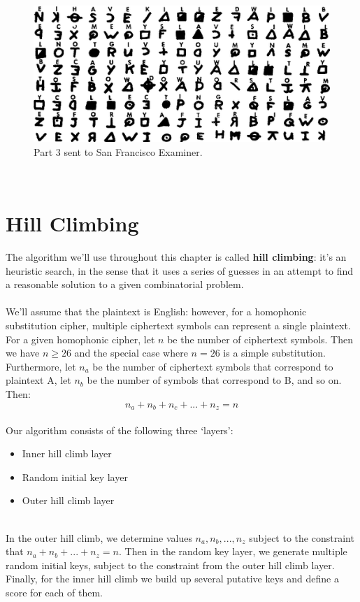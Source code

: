 \documentclass[Lau,binding=0.6cm,oneside]{sapthesis}
\begin{document}
\begin{figure}[H]
\includegraphics[scale=0.7]{zodiac_408_3}
\centering
\caption{Part 3 sent to San Francisco Examiner.}
\centering
\end{figure}
\ \\

\section{Hill Climbing}
The algorithm we'll use throughout this chapter is called \textbf{hill climbing}\supercite{homophonic_cryptanalysis}: it's an heuristic search, in the sense that it uses a series of guesses in an attempt to find a reasonable solution to a given combinatorial problem.\\\\
We'll assume that the plaintext is English: however, for a homophonic substitution cipher, multiple ciphertext symbols can represent a single plaintext. For a given homophonic cipher, let $n$ be the number of ciphertext symbols. Then we have $ n \geq 26 $ and the special case where $ n = 26 $ is a simple substitution. Furthermore, let $n_a$ be the number of ciphertext symbols that correspond to plaintext \textsf{A}, let $n_b$ be the number of symbols that correspond to \textsf{B}, and so on. Then:\\

\begin{equation}
n_a + n_b + n_c + ... + n_z = n
\end{equation}
\ \\
Our algorithm consists of the following three `layers':
\begin{itemize}
\item Inner hill climb layer
\item Random initial key layer
\item Outer hill climb layer
\end{itemize}
\ \\
In the outer hill climb, we determine values $n_a, n_b, ..., n_z$ subject to the constraint that $n_a + n_b + ... + n_z = n$. Then in the random key layer, we generate multiple random initial keys, subject to the constraint from the outer hill climb layer. Finally, for the inner hill climb we build up several putative keys and define a score for each of them.\\\\
\end{document}
